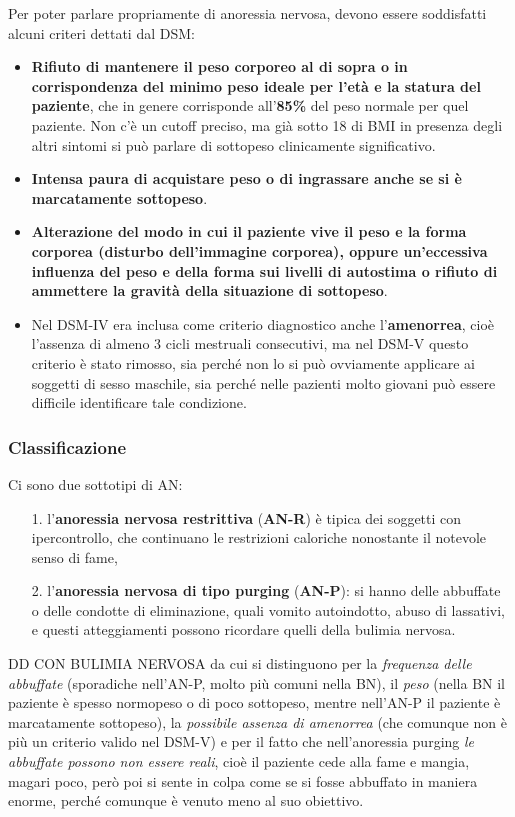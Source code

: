 Per poter parlare propriamente di anoressia nervosa, devono essere
soddisfatti alcuni criteri dettati dal DSM:

\begin{itemize}
\item
  \textbf{Rifiuto di mantenere il peso corporeo al di sopra o in
  corrispondenza del minimo peso ideale per l'età e la statura del
  paziente}, che in genere corrisponde all'\textbf{85\%} del peso
  normale per quel paziente. Non c'è un cutoff preciso, ma già sotto 18
  di BMI in presenza degli altri sintomi si può parlare di sottopeso
  clinicamente significativo.
\item
  \textbf{Intensa paura di acquistare peso o di ingrassare anche se si è
  marcatamente sottopeso}.
\item
  \textbf{Alterazione del modo in cui il paziente vive il peso e la
  forma corporea (disturbo dell'immagine corporea), oppure un'eccessiva
  influenza del peso e della forma sui livelli di autostima o rifiuto di
  ammettere la gravità della situazione di sottopeso}.
\item
  Nel DSM-IV era inclusa come criterio diagnostico anche
  l'\textbf{amenorrea}, cioè l'assenza di almeno 3 cicli mestruali
  consecutivi, ma nel DSM-V questo criterio è stato rimosso, sia perché
  non lo si può ovviamente applicare ai soggetti di sesso maschile, sia
  perché nelle pazienti molto giovani può essere difficile identificare
  tale condizione.
\end{itemize}

\subsubsection{Classificazione}

Ci sono due sottotipi di AN:

\begin{itemize}
\item[1.]
  l'\textbf{anoressia nervosa restrittiva} (\textbf{AN-R}) è tipica dei
  soggetti con ipercontrollo, che continuano le restrizioni caloriche
  nonostante il notevole senso di fame,
\item[2.]
  l'\textbf{anoressia nervosa di tipo purging} (\textbf{AN-P}): si hanno
  delle abbuffate o delle condotte di eliminazione, quali vomito
  autoindotto, abuso di lassativi, e questi atteggiamenti possono
  ricordare quelli della bulimia nervosa.
\end{itemize}

DD CON BULIMIA NERVOSA da cui si distinguono per la \emph{frequenza
delle abbuffate} (sporadiche nell'AN-P, molto più comuni nella BN), il
\emph{peso} (nella BN il paziente è spesso normopeso o di poco
sottopeso, mentre nell'AN-P il paziente è marcatamente sottopeso), la
\emph{possibile assenza di amenorrea} (che comunque non è più un
criterio valido nel DSM-V) e per il fatto che nell'anoressia purging
\emph{le abbuffate possono non essere reali}, cioè il paziente cede alla
fame e mangia, magari poco, però poi si sente in colpa come se si fosse
abbuffato in maniera enorme, perché comunque è venuto meno al suo
obiettivo.

